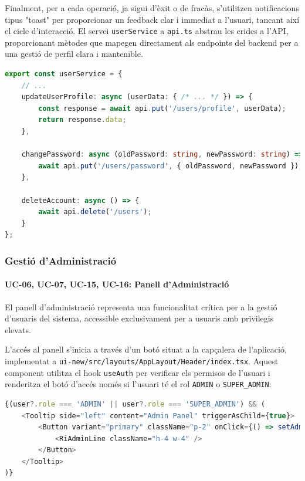 Finalment, per a cada operació, ja sigui d'èxit o de fracàs, s'utilitzen notificacions tipus "toast" per proporcionar un feedback clar i immediat a l'usuari, tancant així el cicle d'interacció. El servei \texttt{userService} a \texttt{api.ts} abstrau les crides a l'API, proporcionant mètodes que mapegen directament als endpoints del backend per a una gestió de perfil clara i mantenible.

\begin{lstlisting}[language=typescript, caption={Mètodes del `userService` a `lib/api.ts`}]
export const userService = {
    // ...
    updateUserProfile: async (userData: { /* ... */ }) => {
        const response = await api.put('/users/profile', userData);
        return response.data;
    },

    changePassword: async (oldPassword: string, newPassword: string) => {
        await api.put('/users/password', { oldPassword, newPassword });
    },

    deleteAccount: async () => {
        await api.delete('/users');
    }
};
\end{lstlisting}

\subsubsection{Gestió d'Administració}
\paragraph{UC-06, UC-07, UC-15, UC-16: Panell d'Administració}
El panell d'administració representa una funcionalitat crítica per a la gestió d'usuaris del sistema, accessible exclusivament per a usuaris amb privilegis elevats.

L'accés al panell s'inicia a través d'un botó situat a la capçalera de l'aplicació, implementat a \texttt{ui-new/src/layouts/AppLayout/Header/index.tsx}. Aquest component utilitza el hook \texttt{useAuth} per verificar els permisos de l'usuari i renderitza el botó d'accés només si l'usuari té el rol \texttt{ADMIN} o \texttt{SUPER\_ADMIN}:

\begin{lstlisting}[language=typescript, caption={Renderitzat condicional del botó d'administració}]
{(user?.role === 'ADMIN' || user?.role === 'SUPER_ADMIN') && (
    <Tooltip side="left" content="Admin Panel" triggerAsChild={true}>
        <Button variant="primary" className="p-2" onClick={() => setAdminOpen(true)}> 
            <RiAdminLine className="h-4 w-4" />
        </Button>
    </Tooltip>
)}
\end{lstlisting}


